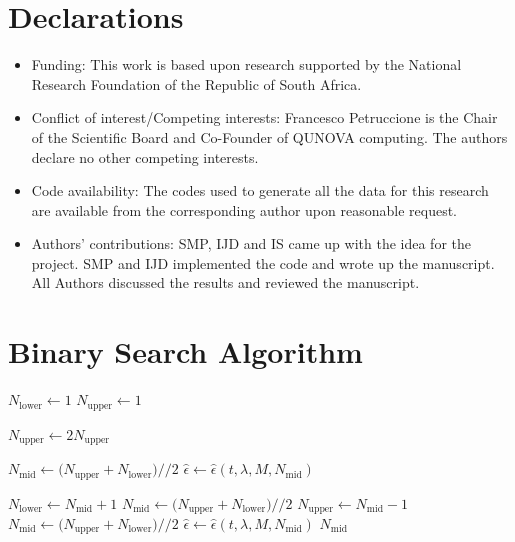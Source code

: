 \documentclass[pdflatex,sn-mathphys-num]{sn-jnl}%
\begin{document}
\section*{Declarations}



\begin{itemize}
\item Funding:
This work is based upon research supported by the
National Research Foundation of the Republic of South
Africa. 
\item Conflict of interest/Competing interests: 
Francesco Petruccione is the Chair of the Scientific Board and Co-Founder of
QUNOVA computing. The authors declare no other competing interests.


\item Code availability: 
The codes used to generate all the data for this research are available from the corresponding author upon reasonable request.

\item Authors' contributions:
SMP, IJD and IS came up with the idea for the project. SMP and IJD implemented the code and wrote up the manuscript. All Authors discussed the results and reviewed the manuscript.
\end{itemize}

\appendix

\section{Binary Search Algorithm}
\begin{algorithm}[h!]
\caption{Binary Search for Minimum $N$ that Achieves Target Precision $\epsilon$}
\label{binary_search}
\begin{algorithmic}
\State $N_{\mathrm{lower}} \gets 1$
\State $N_{\mathrm{upper}} \gets 1$

    \State $N_{\mathrm{upper}} \gets 2N_{\mathrm{upper}}$
\EndWhile

\State $N_{\mathrm{mid}} \gets \big(N_{\mathrm{upper}}+N_{\mathrm{lower}}\big)//2$
\State $\hat{\epsilon} \gets \hat{\epsilon}(t, \lambda, M, N_{\mathrm{mid}})$

    \If{$\hat{\epsilon} > \epsilon$}
        \State $N_{\mathrm{lower}} \gets N_{\mathrm{mid}} + 1$
        \State $N_{\mathrm{mid}} \gets \big(N_{\mathrm{upper}}+N_{\mathrm{lower}}\big)//2$
    \ElsIf {$\hat{\epsilon} < \epsilon$}
        \State $N_{\mathrm{upper}} \gets N_{\mathrm{mid}}-1$
        \State $N_{\mathrm{mid}} \gets \big(N_{\mathrm{upper}}+N_{\mathrm{lower}}\big)//2$
    \EndIf
    \State $\hat{\epsilon} \gets \hat{\epsilon}(t, \lambda, M, N_{\mathrm{mid}})$
\EndWhile
\State \Return $N_{\mathrm{mid}}$
\end{algorithmic}
\end{algorithm}



\end{document}
